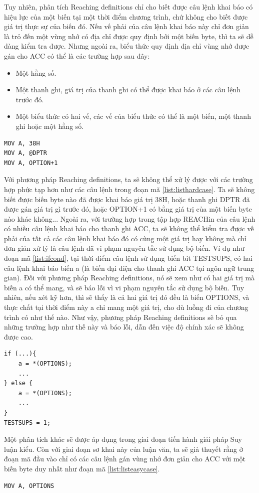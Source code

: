 Tuy nhiên, phân tích Reaching definitions chỉ cho biết được câu lệnh khai báo có hiệu lực của một biến tại một thời điểm chương trình, chứ không cho biết được giá trị thực sự của biến đó. Nếu vế phải của câu lệnh khai báo này chỉ đơn giản là trỏ đến một vùng nhớ có địa chỉ được quy định bởi một biến byte, thì ta sẽ dễ dàng kiểm tra được. Nhưng ngoài ra, biểu thức quy định địa chỉ vùng nhớ được gán cho ACC có thể là các trường hợp sau đây:
\begin{itemize}
	\item Một hằng số.
		\item Một thanh ghi, giá trị của thanh ghi có thể được khai báo ở các câu lệnh trước đó.
	\item Một biểu thức có hai vế, các vế của biểu thức có thể là một biến, một thanh ghi hoặc một hằng số.

\end{itemize}

\begin{lstlisting}[caption={Một số câu lệnh gán mà phương pháp Suy luận kiểu sử dụng Reaching definitions không xử lý được},label={list:listhardcase}]
MOV A, 38H
MOV A, @DPTR
MOV A, OPTION+1
\end{lstlisting}
Với phương pháp Reaching definitions, ta sẽ không thể xử lý được với các trường hợp phức tạp hơn như các câu lệnh trong đoạn mã \ref{list:listhardcase}. Ta sẽ không biết được biến byte nào đã được khai báo giá trị 38H, hoặc thanh ghi DPTR đã được gán giá trị gì trước đó, hoặc OPTION+1 có bằng giá trị của một biến byte nào khác không... Ngoài ra, với trường hợp trong tập hợp REACHin của câu lệnh có nhiều câu lệnh khai báo cho thanh ghi ACC, ta sẽ không thể kiểm tra được vế phải của tất cả các câu lệnh khai báo đó có cùng một giá trị hay không mà chỉ đơn giản xử lý là câu lệnh đã vi phạm nguyên tắc sử dụng bộ biến. Ví dụ như đoạn mã \ref{list:ifcond}, tại thời điểm câu lệnh sử dụng biến bit TESTSUPS, có hai câu lệnh khai báo biến a (là biến đại diện cho thanh ghi ACC tại ngôn ngữ trung gian). Đối với phương pháp Reaching definitions, nó sẽ xem như có hai giá trị mà biến a có thể mang, và sẽ báo lỗi vì vi phạm nguyên tắc sử dụng bộ biến. Tuy nhiên, nếu xét kỹ hơn, thì sẽ thấy là cả hai giá trị đó đều là biến OPTIONS, và thực chất tại thời điểm này a chỉ mang một giá trị, cho dù luồng đi của chương trình có như thế nào. Như vậy, phương pháp Reaching definitions sẽ bỏ qua những trường hợp như thế này và báo lỗi, dẫn đến việc độ chính xác sẽ không được cao.
\begin{lstlisting}[caption={Đoạn mã có nhiều câu lệnh khai báo cho ACC đến được một điểm của chương trình nhưng tất cả đều cùng giá trị},label={list:ifcond}]
if (...){
	a = *(OPTIONS);
	...
} else {
	a = *(OPTIONS);
	...
}
TESTSUPS = 1;
\end{lstlisting}
Một phân tích khác sẽ được áp dụng trong giai đoạn tiến hành giải pháp Suy luận kiểu. Còn với giai đoạn sơ khai này của luận văn, ta sẽ giả thuyết rằng ở đoạn mã đầu vào chỉ có các câu lệnh gán vùng nhớ đơn giản cho ACC với một biến byte duy nhất như đoạn mã \ref{list:listeasycase}.
\begin{lstlisting}[caption={Mẫu câu lệnh gán cho thanh ghi ACC được chấp nhận hiện giờ},label={list:listeasycase}]
MOV A, OPTIONS
\end{lstlisting}
